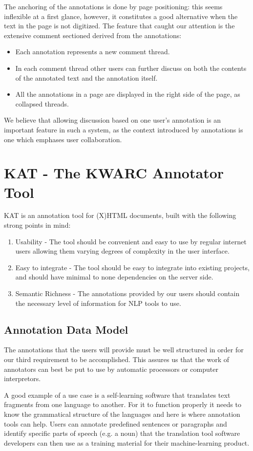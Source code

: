 \documentclass[a4paper, 12pt, notitlepage]{report}
\begin{document}
The anchoring of the annotations is done by page positioning: this seems inflexible at a first glance, however, it constitutes a good alternative when the text in the page is not digitized.
The feature that caught our attention is the extensive comment sectioned derived from the annotations:
\begin{itemize}
 \item Each annotation represents a new comment thread.
 \item In each comment thread other users can further discuss on both the contents of the annotated text and the annotation itself.
 \item All the annotations in a page are displayed in the right side of the page, as collapsed threads.
\end{itemize}
We believe that allowing discussion based on one user's annotation is an important feature in such a system, as the context introduced by annotations is one which emphases user collaboration.


\chapter{KAT - The KWARC Annotator Tool}
KAT is an annotation tool for (X)HTML documents, built with the following strong points in
mind:
\begin{enumerate}
\item Usability - The tool should be convenient and easy to use by regular internet users
  allowing them varying degrees of complexity in the user interface.
\item Easy to integrate - The tool should be easy to integrate into existing projects, and
  should have minimal to none dependencies on the server side.
\item Semantic Richness - The annotations provided by our users should contain the
  necessary level of information for NLP tools to use.
\end{enumerate}
\section{Annotation Data Model}
The annotations that the users will provide must be well structured in order for our third
requirement to be accomplished. This assures us that the work of annotators can best be
put to use by automatic processors or computer interpretors.

A good example of a use case is a self-learning software that translates text fragments
from one language to another.  For it to function properly it needs to know the
grammatical structure of the languages and here is where annotation tools can help.  Users
can annotate predefined sentences or paragraphs and identify specific parts of speech
(e.g. a noun) that the translation tool software developers can then use as a training
material for their machine-learning product.
\end{document}

